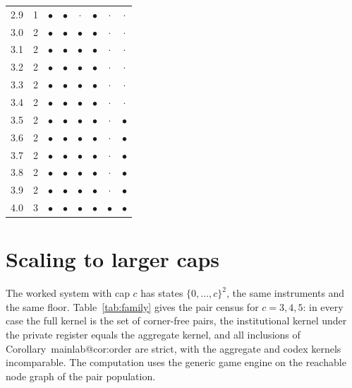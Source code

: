 \documentclass[11pt,a4paper]{article}
\makeatletter
\theoremstyle{plain}
\theoremstyle{definition}
\theoremstyle{remark}
\newcommand{\mref}[1]{\csname mainlab@#1\endcsname}
\makeatother
\begin{document}
\begin{table}[H]
\begin{tabular}{rrcccccc}
2.9 & 1 & $\bullet$ & $\bullet$ & $\cdot$ & $\bullet$ & $\cdot$ & $\cdot$ \\
3.0 & 2 & $\bullet$ & $\bullet$ & $\bullet$ & $\bullet$ & $\cdot$ & $\cdot$ \\
3.1 & 2 & $\bullet$ & $\bullet$ & $\bullet$ & $\bullet$ & $\cdot$ & $\cdot$ \\
3.2 & 2 & $\bullet$ & $\bullet$ & $\bullet$ & $\bullet$ & $\cdot$ & $\cdot$ \\
3.3 & 2 & $\bullet$ & $\bullet$ & $\bullet$ & $\bullet$ & $\cdot$ & $\cdot$ \\
3.4 & 2 & $\bullet$ & $\bullet$ & $\bullet$ & $\bullet$ & $\cdot$ & $\cdot$ \\
3.5 & 2 & $\bullet$ & $\bullet$ & $\bullet$ & $\bullet$ & $\cdot$ & $\bullet$ \\
3.6 & 2 & $\bullet$ & $\bullet$ & $\bullet$ & $\bullet$ & $\cdot$ & $\bullet$ \\
3.7 & 2 & $\bullet$ & $\bullet$ & $\bullet$ & $\bullet$ & $\cdot$ & $\bullet$ \\
3.8 & 2 & $\bullet$ & $\bullet$ & $\bullet$ & $\bullet$ & $\cdot$ & $\bullet$ \\
3.9 & 2 & $\bullet$ & $\bullet$ & $\bullet$ & $\bullet$ & $\cdot$ & $\bullet$ \\
4.0 & 3 & $\bullet$ & $\bullet$ & $\bullet$ & $\bullet$ & $\bullet$ & $\bullet$ \\
\bottomrule
\end{tabular}
\end{table}
\section{Scaling to larger caps}\label{si:family}

The worked system with cap $c$ has states $\{0,\dots,c\}^2$, the same instruments and the same floor. Table~\ref{tab:family} gives the pair census for $c=3,4,5$: in every case the full kernel is the set of corner-free pairs, the institutional kernel under the private register equals the aggregate kernel, and all inclusions of Corollary~\mref{cor:order} are strict, with the aggregate and codex kernels incomparable. The computation uses the generic game engine on the reachable node graph of the pair population.
\end{document}
